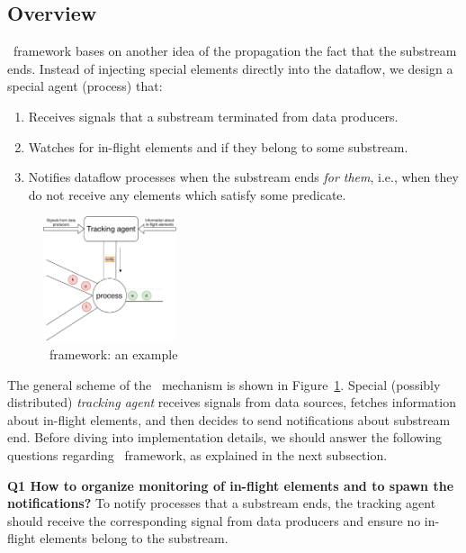 \label{fs-acker-preliminaries}

\subsection{Overview}

\tracker\ framework bases on another idea of the propagation the fact that the substream ends. Instead of injecting special elements directly into the dataflow, we design a special agent (process) that:

\begin{enumerate}
    \item Receives signals that a substream terminated from data producers.
    \item Watches for in-flight elements and if they belong to some substream.
    \item Notifies dataflow processes when the substream ends {\em for them}, i.e., when they do not receive any elements which satisfy some predicate.
\end{enumerate}

\begin{figure}[htbp]
  \centering
  \includegraphics[width=0.35\textwidth]{pics/tracker-scheme.pdf}
  \caption{\tracker\ framework: an example}
  \label{tracker_scheme}
\end{figure}

The general scheme of the \tracker\ mechanism is shown in Figure~\ref{tracker_scheme}. Special (possibly distributed) {\em tracking agent} receives signals from data sources, fetches information about in-flight elements, and then decides to send notifications about substream end. Before diving into implementation details, we should answer the following questions regarding \tracker\ framework, as explained in the next subsection.

{\bf Q1 How to organize monitoring of in-flight elements and to spawn the notifications?} To notify processes that a substream ends, the tracking agent should receive the corresponding signal from data producers and ensure no in-flight elements belong to the substream. 

